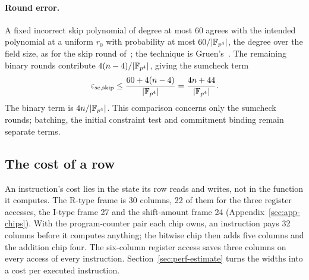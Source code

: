 \paragraph{Round error.}
A fixed incorrect skip polynomial of degree at most 60 agrees with the intended polynomial at a uniform $r_0$ with probability at most $60/|\mathbb{F}_{p^4}|$, the degree over the field size, as for the skip round of~\citep[Thm.~4.1.1]{swirl}; the technique is Gruen's~\citep{gruen-zerocheck}. The remaining binary rounds contribute $4(n-4)/|\mathbb{F}_{p^4}|$, giving the sumcheck term
\begin{equation}
\label{eq:skip-round-error}
  \varepsilon_{\mathrm{sc,skip}}
   \le\frac{60+4(n-4)}{|\mathbb{F}_{p^4}|}
   =\frac{4n+44}{|\mathbb{F}_{p^4}|}.
\end{equation}
The binary term is $4n/|\mathbb{F}_{p^4}|$. This comparison concerns only the sumcheck rounds; batching, the initial constraint test and commitment binding remain separate terms.

\subsection{The cost of a row}
\label{sec:air-cost}

An instruction's cost lies in the state its row reads and writes, not in the function it computes. The R-type frame is 30 columns, 22 of them for the three register accesses, the I-type frame 27 and the shift-amount frame 24 (Appendix~\ref{sec:app-chips}). With the program-counter pair each chip owns, an instruction pays 32 columns before it computes anything; the bitwise chip then adds five columns and the addition chip four. The six-column register access saves three columns on every access of every instruction. Section~\ref{sec:perf-estimate} turns the widths into a cost per executed instruction.

